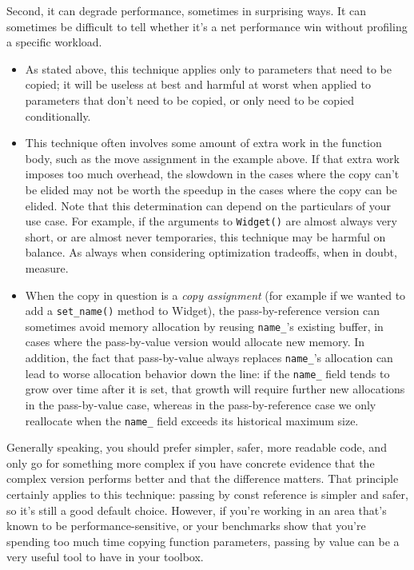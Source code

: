 Second, it can degrade performance, sometimes in surprising ways. It can sometimes be difficult to tell whether it’s a net performance win without profiling a specific workload.

\begin{itemize}
    \item As stated above, this technique applies only to parameters that need to be copied; it will be useless at best and harmful at worst when applied to parameters that don’t need to be copied, or only need to be copied conditionally.
    \item This technique often involves some amount of extra work in the function body, such as the move assignment in the example above. If that extra work imposes too much overhead, the slowdown in the cases where the copy can’t be elided may not be worth the speedup in the cases where the copy can be elided. Note that this determination can depend on the particulars of your use case. For example, if the arguments to \texttt{Widget()} are almost always very short, or are almost never temporaries, this technique may be harmful on balance. As always when considering optimization tradeoffs, when in doubt, measure.
    \item When the copy in question is a \emph{copy assignment} (for example if we wanted to add a \texttt{set_name()} method to Widget), the pass-by-reference version can sometimes avoid memory allocation by reusing \texttt{name_}’s existing buffer, in cases where the pass-by-value version would allocate new memory. In addition, the fact that pass-by-value always replaces \texttt{name_}’s allocation can lead to worse allocation behavior down the line: if the \texttt{name_} field tends to grow over time after it is set, that growth will require further new allocations in the pass-by-value case, whereas in the pass-by-reference case we only reallocate when the \texttt{name_} field exceeds its historical maximum size.
\end{itemize}

Generally speaking, you should prefer simpler, safer, more readable code, and only go for something more complex if you have concrete evidence that the complex version performs better and that the difference matters. That principle certainly applies to this technique: passing by const reference is simpler and safer, so it’s still a good default choice. However, if you’re working in an area that’s known to be performance-sensitive, or your benchmarks show that you’re spending too much time copying function parameters, passing by value can be a very useful tool to have in your toolbox.
